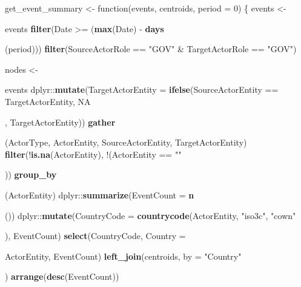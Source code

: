 \documentclass[]{article}
\newenvironment{Shaded}{\begin{snugshade}}{\end{snugshade}}
\newcommand{\KeywordTok}[1]{\textcolor[rgb]{0.13,0.29,0.53}{\textbf{{#1}}}}
\newcommand{\DataTypeTok}[1]{\textcolor[rgb]{0.13,0.29,0.53}{{#1}}}
\newcommand{\DecValTok}[1]{\textcolor[rgb]{0.00,0.00,0.81}{{#1}}}
\newcommand{\StringTok}[1]{\textcolor[rgb]{0.31,0.60,0.02}{{#1}}}
\newcommand{\OtherTok}[1]{\textcolor[rgb]{0.56,0.35,0.01}{{#1}}}
\newcommand{\NormalTok}[1]{{#1}}
\begin{document}
\begin{Shaded}
\begin{Highlighting}[]
\NormalTok{get_event_summary <-}\StringTok{ }\NormalTok{function(events, centroids, }\DataTypeTok{period =} \DecValTok{0}\NormalTok{) \{}
  \NormalTok{events <-}\StringTok{ }\NormalTok{events %>%}
\StringTok{    }\KeywordTok{filter}\NormalTok{(Date >=}\StringTok{ }\NormalTok{(}\KeywordTok{max}\NormalTok{(Date) -}\StringTok{ }\KeywordTok{days}\NormalTok{(period))) %>%}
\StringTok{    }\KeywordTok{filter}\NormalTok{(SourceActorRole ==}\StringTok{ "GOV"} \NormalTok{&}\StringTok{ }\NormalTok{TargetActorRole ==}\StringTok{ "GOV"}\NormalTok{)}
  
  \NormalTok{nodes <-}\StringTok{ }\NormalTok{events %>%}
\StringTok{    }\NormalTok{dplyr::}\KeywordTok{mutate}\NormalTok{(}\DataTypeTok{TargetActorEntity =} \KeywordTok{ifelse}\NormalTok{(SourceActorEntity ==}\StringTok{ }\NormalTok{TargetActorEntity, }\OtherTok{NA}\NormalTok{, TargetActorEntity)) %>%}
\StringTok{    }\KeywordTok{gather}\NormalTok{(ActorType, ActorEntity, SourceActorEntity, TargetActorEntity) %>%}
\StringTok{    }\KeywordTok{filter}\NormalTok{(!}\KeywordTok{is.na}\NormalTok{(ActorEntity), !(ActorEntity ==}\StringTok{ ""}\NormalTok{)) %>%}
\StringTok{    }\KeywordTok{group_by}\NormalTok{(ActorEntity) %>%}
\StringTok{    }\NormalTok{dplyr::}\KeywordTok{summarize}\NormalTok{(}\DataTypeTok{EventCount =} \KeywordTok{n}\NormalTok{()) %>%}
\StringTok{    }\NormalTok{dplyr::}\KeywordTok{mutate}\NormalTok{(}\DataTypeTok{CountryCode =} \KeywordTok{countrycode}\NormalTok{(ActorEntity, }\StringTok{"iso3c"}\NormalTok{, }\StringTok{"cown"}\NormalTok{), EventCount) %>%}
\StringTok{    }\KeywordTok{select}\NormalTok{(CountryCode, }\DataTypeTok{Country =} \NormalTok{ActorEntity, EventCount) %>%}
\StringTok{    }\KeywordTok{left_join}\NormalTok{(centroids, }\DataTypeTok{by =} \StringTok{"Country"}\NormalTok{) %>%}
\StringTok{    }\KeywordTok{arrange}\NormalTok{(}\KeywordTok{desc}\NormalTok{(EventCount)) }
  
}}}}}}}}}}}
\end{Highlighting}
\end{Shaded}
\end{document}
